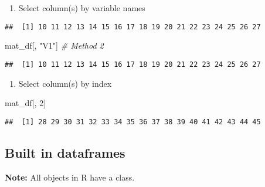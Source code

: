 \documentclass[]{book}
\newenvironment{Shaded}{\begin{snugshade}}{\end{snugshade}}
\newcommand{\CommentTok}[1]{\textcolor[rgb]{0.56,0.35,0.01}{\textit{#1}}}
\newcommand{\DecValTok}[1]{\textcolor[rgb]{0.00,0.00,0.81}{#1}}
\newcommand{\NormalTok}[1]{#1}
\newcommand{\OperatorTok}[1]{\textcolor[rgb]{0.81,0.36,0.00}{\textbf{#1}}}
\newcommand{\StringTok}[1]{\textcolor[rgb]{0.31,0.60,0.02}{#1}}
\providecommand{\tightlist}{%
  \setlength{\itemsep}{0pt}\setlength{\parskip}{0pt}}
\begin{document}
\begin{enumerate}
\def\labelenumi{\arabic{enumi}.}
\tightlist
\item
  Select column(s) by variable names
\end{enumerate}

\begin{Shaded}
\end{Shaded}

\begin{verbatim}
##  [1] 10 11 12 13 14 15 16 17 18 19 20 21 22 23 24 25 26 27
\end{verbatim}

\begin{Shaded}
\begin{Highlighting}[]
\NormalTok{mat_df[, }\StringTok{"V1"}\NormalTok{] }\CommentTok{# Method 2}
\end{Highlighting}
\end{Shaded}

\begin{verbatim}
##  [1] 10 11 12 13 14 15 16 17 18 19 20 21 22 23 24 25 26 27
\end{verbatim}

\begin{enumerate}
\def\labelenumi{\arabic{enumi}.}
\setcounter{enumi}{1}
\tightlist
\item
  Select column(s) by index
\end{enumerate}

\begin{Shaded}
\begin{Highlighting}[]
\NormalTok{mat_df[, }\DecValTok{2}\NormalTok{]}
\end{Highlighting}
\end{Shaded}

\begin{verbatim}
##  [1] 28 29 30 31 32 33 34 35 36 37 38 39 40 41 42 43 44 45
\end{verbatim}

\hypertarget{built-in-dataframes}{%
\subsection{Built in dataframes}\label{built-in-dataframes}}

\textbf{Note:} All objects in R have a class.
\end{document}
